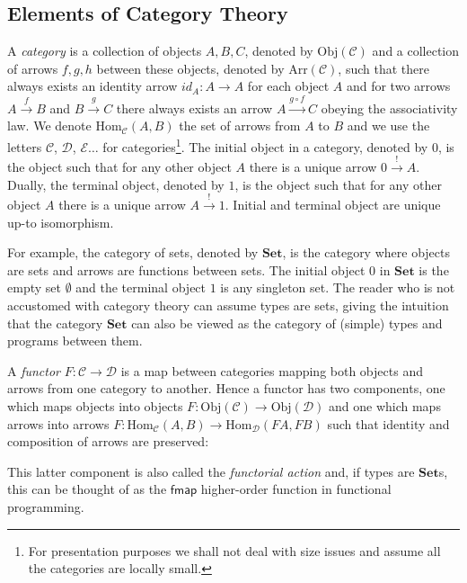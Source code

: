 \documentclass[a4paper,anonymous, UKenglish,cleveref, autoref, thm-restate]{lipics-v2021}
\newcommand{\operator}[1]{\textsf{#1}}
\newcommand{\CatC}{\mathcal{C}}
\newcommand{\CatD}{\mathcal{D}}
\newcommand{\CatE}{\mathcal{E}}
\newcommand{\Set}{\mathbf{Set}}
\newcommand{\Hom}{\text{Hom}}
\newcommand{\Obj}{\text{Obj}}
\newcommand{\Arr}{\text{Arr}}
\begin{document}
\subsection{Elements of Category Theory}
A \emph{category} is a collection of objects $A, B, C$, denoted by $\Obj(\CatC)$
and a collection of arrows $f, g, h$ between these objects, denoted by
$\Arr (\CatC)$, such that there always exists an identity arrow
$id_{A} : A \to A$ for each object $A$ and for two arrows $A \xrightarrow{f} B$
and $B \xrightarrow{g} C$ there always exists an arrow
$A \xrightarrow{g\circ f} C$ obeying the associativity law. We denote
$\Hom_{\CatC} (A, B)$ the set of arrows from $A$ to $B$ and we use the letters
$\CatC$, $\CatD$, $\CatE\dots$ for categories\footnote[1]{For presentation
purposes we shall not deal with size issues and assume all the categories are
locally small.}. The initial object in a category, denoted by $0$, is the object such
that for any other object $A$ there is a unique arrow $0 \xrightarrow{!} A$.
Dually, the terminal object, denoted by $1$, is the object such that for any
other object $A$ there is a unique arrow $A \xrightarrow{!} 1$. Initial and
terminal object are unique up-to isomorphism.

For example, the category of sets, denoted by $\Set$, is the category where
objects are sets and arrows are functions between sets. The initial object $0$
in $\Set$ is the empty set $\emptyset$ and the terminal object $1$ is any
singleton set. The reader who is not accustomed with category theory can assume
types are sets, giving the intuition that the category $\Set$ can also be viewed
as the category of (simple) types and programs between them.

A \emph{functor} $F : \CatC \to \CatD$ is a map between categories mapping both
objects and arrows from one category to another. Hence a functor has two
components, one which maps objects into objects
$F : \Obj(\CatC) \to \Obj(\CatD)$ and one which maps arrows into arrows
$F : \Hom_{\CatC}(A, B) \to \Hom_{\CatD} (FA,FB)$ such that identity and
composition of arrows are preserved:
This latter component is also called the \emph{functorial action} and, if types
are $\Set$s, this can be thought of as the $\operator{fmap}$ higher-order
function in functional programming.
\end{document}
